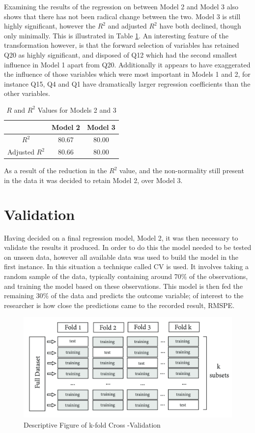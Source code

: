 \documentclass[11pt,a4paper]{report}
\begin{document}
Examining the results of the regression on between Model 2 and Model 3 also shows that there has not been radical change between the two. Model 3 is still highly significant, however the $R^2$ and adjusted $R^2$ have both declined, though only minimally. This is illustrated in Table \ref{table:Model2v3}. An interesting feature of the transformation however, is that the forward selection of variables has retained Q20 as highly significant, and disposed of Q12 which had the second smallest influence in Model 1 apart from Q20. Additionally it appears to have exaggerated the influence of those variables which were most important in Models 1 and 2, for instance Q15, Q4 and Q1 have dramatically larger regression coefficients than the other variables. 


\begin{table}[H]
	\centering
	\caption{$R$ and $R^{2}$ Values for Models 2 and 3}
	\begin{tabular}{ccc}
		\hline \hline
		& Model 2 & Model 3 \\[0.1cm]
	\hline
	$R^2$ & 80.67 & 80.00 \\
	Adjusted $R^2$ & 80.66 & 80.00 \\	
	\hline \hline
	\end{tabular}

\label{table:Model2v3}
\end{table}

As a result of the reduction in the $R^2$ value, and the non-normality still present in the data it was decided to retain Model 2, over Model 3. 


\section{Validation} \label{regmodelvalidation}
Having decided on a final regression model, Model 2, it was then necessary to validate the results it produced. In order to do this the model needed to be tested on unseen data, however all available data was used to build the model in the first instance. In this situation a technique called \ac{CV} is used. It involves taking a random sample of the data, typically containing around 70\% of the observations, and training the model based on these observations. This model is then fed the remaining 30\% of the data and predicts the outcome variable; of interest to the researcher is how close the predictions came to the recorded result, \ac{RMSPE}.

\begin{figure}[H]
	\centering
	\includegraphics[width=0.7\linewidth]{"images/k-fold_cross_validation"}
	\caption{Descriptive Figure of k-fold Cross -Validation}
	\label{fig:k-foldcrossvalidation}
\end{figure}
\end{document}
